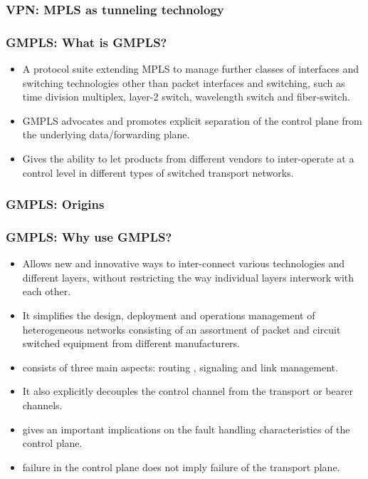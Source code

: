 \documentclass[12pt]{beamer}
\begin{document}
\begin{frame}
  \frametitle{VPN: MPLS as tunneling technology}
\end{frame}

\begin{frame}
  \frametitle{GMPLS: What is GMPLS?}
  \begin{itemize}
    \item A protocol suite extending MPLS to manage further classes of interfaces and switching technologies other than packet interfaces and switching, such as time division multiplex, layer-2 switch, wavelength switch and fiber-switch.
    \item GMPLS advocates and promotes explicit separation of the control plane from the underlying data/forwarding plane.
    \item Gives the ability to let products from different vendors to inter-operate at a control level in different types of switched transport networks.
  \end{itemize}
\end{frame}

\begin{frame}
  \frametitle{GMPLS: Origins}
  \begin{figure}[h]
    \begin{center}
    \end{center}
  \end{figure}
\end{frame}

\begin{frame}
  \frametitle{GMPLS: Why use GMPLS?}
  \begin{itemize}                             
    \item Allows new and innovative ways to inter-connect various technologies and different layers, without restricting the way individual layers interwork with each other. 
    \item It simplifies the design, deployment and operations management of heterogeneous networks consisting of an assortment of packet and circuit switched equipment from different manufacturers.
    \item consists of three main aspects: routing , signaling and link management.
    \item It also explicitly decouples the control channel from the transport or bearer channels.
    \item gives an important implications on the fault handling characteristics of the control plane.
    \item failure in the control plane does not imply failure of the transport plane.
  \end{itemize}
\end{frame}
\end{document}
